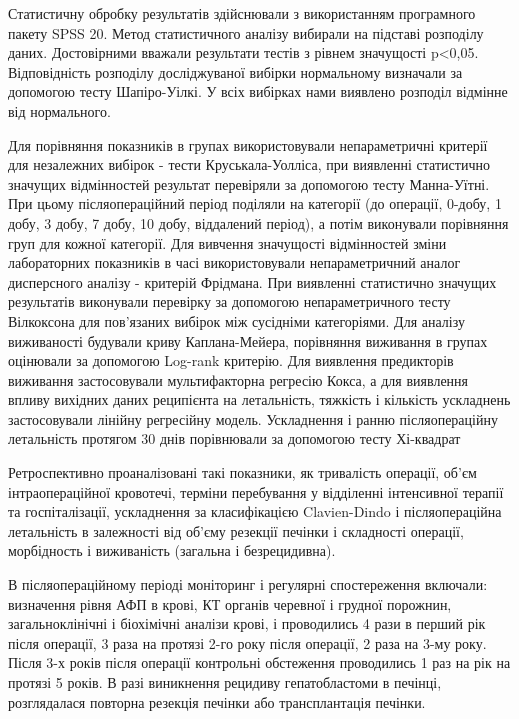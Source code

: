 Статистичну обробку результатів здійснювали з використанням програмного пакету SPSS 20. Метод статистичного аналізу вибирали на підставі розподілу даних. Достовірними вважали результати тестів з рівнем значущості p<0,05. Відповідність розподілу досліджуваної вибірки нормальному визначали за допомогою тесту Шапіро-Уілкі. У всіх вибірках нами виявлено розподіл відмінне від нормального.

Для порівняння показників в групах використовували непараметричні критерії для незалежних вибірок - тести Круськала-Уолліса, при виявленні статистично значущих відмінностей результат перевіряли за допомогою тесту Манна-Уїтні. При цьому післяопераційний період поділяли на категорії (до операції, 0-добу, 1 добу, 3 добу, 7 добу, 10 добу, віддалений період), а потім виконували порівняння груп для кожної категорії. Для вивчення значущості відмінностей зміни лабораторних показників в часі використовували непараметричний аналог дисперсного аналізу - критерій Фрідмана. При виявленні статистично значущих результатів виконували перевірку за допомогою непараметричного тесту Вілкоксона для пов'язаних вибірок між сусідніми категоріями. Для аналізу виживаності будували криву Каплана-Мейера, порівняння виживання в групах оцінювали за допомогою Log-rank критерію. Для виявлення предикторів виживання застосовували мультифакторна регресію Кокса, а для виявлення впливу вихідних даних реципієнта на летальність, тяжкість і кількість ускладнень застосовували лінійну регресійну модель. Ускладнення і ранню післяопераційну летальність протягом 30 днів порівнювали за допомогою тесту Хі-квадрат




Ретроспективно проаналізовані такі показники, як тривалість операції, об’єм інтраопераційної кровотечі, терміни перебування у відділенні інтенсивної терапії та госпіталізації, ускладнення за класифікацією Clavien-Dindo і післяопераційна летальність в залежності від об’єму резекції печінки і складності операції, морбідность і виживаність (загальна і безрецидивна). 

В післяопераційному періоді моніторинг і регулярні спостереження включали: визначення рівня АФП в крові, КТ органів черевної і грудної порожнин, загальноклінічні і біохімічні аналізи крові, і проводились 4 рази в перший рік після операції, 3 раза на протязі 2-го року після операції, 2 раза на 3-му року. Після 3-х років після операції контрольні обстеження проводились 1 раз на рік на протязі 5 років. В разі виникнення рецидиву гепатобластоми в печінці, розглядалася повторна резекція печінки або трансплантація печінки.



